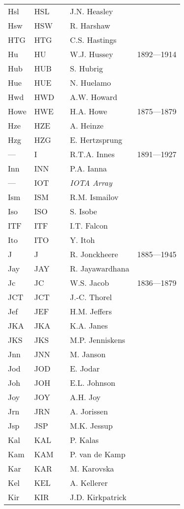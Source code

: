 \begin{longtable}{l|l|c|p{59mm}|l}
Hsl & HSL &   & J.N. Heasley & \\
Hsw & HSW &   & R. Harshaw & \\
HTG & HTG &   & C.S. Hastings & \\
Hu  & HU  &   & W.J. Hussey & 1892---1914 \\
Hub & HUB &   & S. Hubrig & \\
Hue & HUE &   & N. Huelamo & \\
Hwd & HWD &   & A.W. Howard & \\
Howe & HWE &   & H.A. Howe & 1875---1879 \\
Hze & HZE &   & A. Heinze & \\
Hzg & HZG &   & E. Hertzsprung & \\\midrule
--- & I   &   & R.T.A. Innes & 1891---1927 \\
Inn & INN &   & P.A. Ianna & \\
--- & IOT &   & \emph{IOTA Array} & \\
Ism & ISM &   & R.M. Ismailov & \\
Iso & ISO &   & S. Isobe & \\
ITF & ITF &   & I.T. Falcon & \\
Ito & ITO &   & Y. Itoh & \\\midrule
J   & J   &   & R. Jonckheere & 1885---1945 \\
Jay & JAY &   & R. Jayawardhana & \\
Jc  & JC  &   & W.S. Jacob & 1836---1879 \\
JCT & JCT &   & J.-C. Thorel & \\
Jef & JEF &   & H.M. Jeffers & \\
JKA & JKA &   & K.A. Janes & \\
JKS & JKS &   & M.P. Jenniskens & \\
Jnn & JNN &   & M. Janson & \\
Jod & JOD &   & E. Jodar & \\
Joh & JOH &   & E.L. Johnson & \\
Joy & JOY &   & A.H. Joy & \\
Jrn & JRN &   & A. Jorissen & \\
Jsp & JSP &   & M.K. Jessup & \\\midrule
Kal & KAL &   & P. Kalas & \\
Kam & KAM &   & P. van de Kamp & \\
Kar & KAR &   & M. Karovska & \\
Kel & KEL &   & A. Kellerer & \\
Kir & KIR &   & J.D. Kirkpatrick & \\

\end{longtable}
